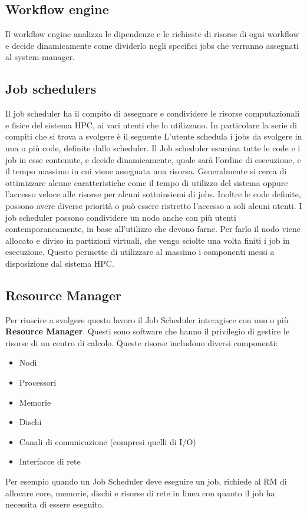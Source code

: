 \subsection{Workflow engine}
Il workflow engine analizza le dipendenze e le richieste di risorse di ogni workflow e decide dinamicamente come dividerlo negli specifici jobs che verranno assegnati al system-manager.

\subsection{Job schedulers}
Il job scheduler ha il compito di assegnare e condividere le risorse computazionali e fisice del sistema HPC, ai vari utenti che lo utilizzano. In particolare la serie di compiti che si trova a svolgere è il seguente L'utente schedula i jobs da svolgere in una o più code, definite dallo scheduler. Il Job scheduler esamina tutte le code e i job in esse contenute, e decide dinamicamente, quale sarà l'ordine di esecuzione, e il tempo massimo in cui viene assegnata una risorsa. Generalmente si cerca di ottimizzare alcune caratteristiche come il tempo di utilizzo del sistema oppure l'accesso veloce alle risorse per alcuni sottoinsiemi di jobs. Inoltre le code definite, possono avere diverse priorità o può essere ristretto l'accesso a soli alcuni utenti. I job scheduler possono condividere un nodo anche con più utenti contemporaneamente, in base all'utilizzo che devono farne. Per farlo il nodo viene allocato e diviso in partizioni virtuali, che vengo sciolte una volta finiti i job in esecuzione. Questo permette di utilizzare al massimo i componenti messi a disposizione dal sistema HPC.

\subsection{Resource Manager}
Per riuscire a svolgere questo lavoro il Job Scheduler interagisce con uno o più \textbf{Resource Manager}. Questi sono software che hanno il privilegio di gestire le risorse di un centro di calcolo. Queste risorse includono diversi componenti:
\begin{itemize}
    \item Nodi
    \item Processori
    \item Memorie
    \item Dischi
    \item Canali di comunicazione (compresi quelli di I/O)
    \item Interfacce di rete 
\end{itemize}
Per esempio quando un Job Scheduler deve eseguire un job, richiede al RM di allocare core, memorie, dischi e risorse di rete in linea con quanto il job ha necessita di essere eseguito.

